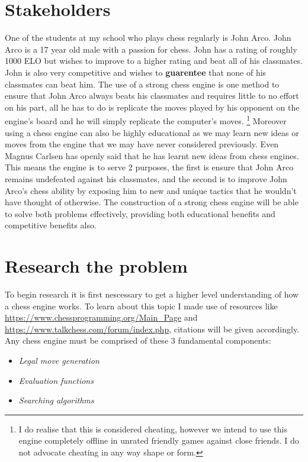 \section{Stakeholders}
One of the students at my school who plays chess regularly is 
John Arco. John Arco is a 17 year old male with a passion for chess.
John has a rating of roughly 1000 ELO but wishes 
to improve to a higher rating and beat all of his 
classmates. John is also very competitive and wishes to 
\textbf{guarentee} that none of his classmates can beat him.
The use of a strong chess engine is one method to ensure
that John Arco always beats his classmates and requires little
to no effort on his part, all he has to do is replicate the 
moves played by his opponent on the engine's board and he 
will simply replicate the computer's moves. 
\footnote{I do realise that this is considered cheating,
however we intend to use this engine completely offline
in unrated friendly games against close friends. 
I do not advocate cheating in any way shape or form.}
Moreover using a chess engine can also be highly educational as
we may learn new ideas or moves from the engine that we may have
never considered previously. Even Magnus Carlsen
has openly said that he has learnt new ideas from chess engines.
\cite{lex} This means the engine is to serve 2 purposes,
the first is ensure that John Arco remains undefeated 
against his classmates, and the second is to improve John Arco's
chess ability by exposing him to new and unique tactics that 
he wouldn't have thought of otherwise. The construction of 
a strong chess engine will be able to solve both problems
effectively, providing both educational benefits and 
competitive benefits also.

\section{Research the problem}
To begin research it is first nescessary to get a higher level understanding
of how a chess engine works. To learn about this topic
I made use of resources like \url{https://www.chessprogramming.org/Main_Page}
and \url{https://www.talkchess.com/forum/index.php}, citations will be 
given accordingly.\\

Any chess engine must be comprised of these 3 fundamental components:
\begin{itemize}
  \item \textit{Legal move generation}
  \item \textit{Evaluation functions}
  \item \textit{Searching algorithms}
\end{itemize}

